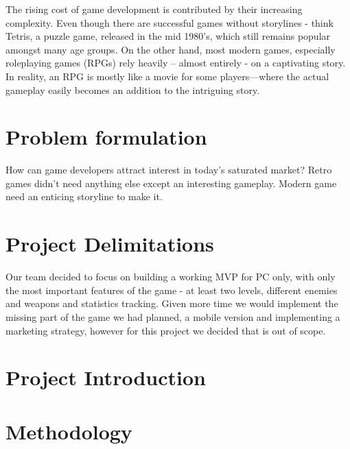 \documentclass[12p]{article}
\begin{document}
The rising cost of game development is contributed by their increasing complexity. Even though there are successful games without storylines - think Tetris, a puzzle game, released in the mid 1980’s, which still remains popular amongst many age groups. On the other hand, most modern games, especially roleplaying games (RPGs) rely heavily – almost entirely - on a captivating story. In reality, an RPG is mostly like a movie for some players—where the actual gameplay easily becomes an addition to the intriguing story.\cite{GameDevelopmentEssentials}

\section{Problem formulation} \label{ProblemFormulation}

How can game developers attract interest in today’s saturated market? Retro games didn’t need anything else except an interesting gameplay. Modern game need an enticing storyline to make it.

\section{Project Delimitations} \label{ProjectDelimitations}

Our team decided to focus on building a working MVP for PC only, with only the most important features of the game - at least two levels, different enemies and weapons and statistics tracking. Given more time we would implement the missing part of the game we had planned, a mobile version and implementing a marketing strategy, however for this project we decided that is out of scope.

\section{Project Introduction} \label{ProjectIntroduction}


\newpage
\section{Methodology} \label{Methodology}

\end{document}
